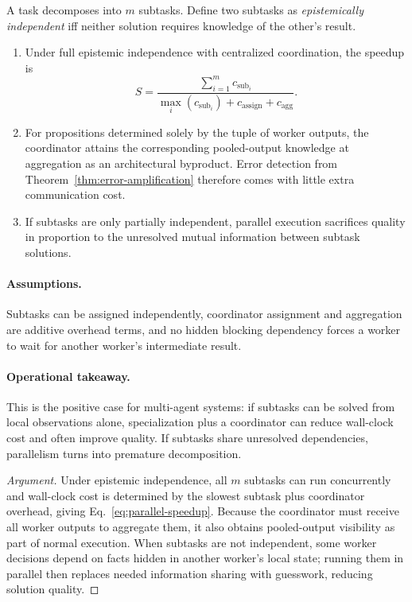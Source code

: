 \begin{definition}
\label{thm:parallel-acceleration}
A task decomposes into $m$ subtasks. Define two subtasks as \emph{epistemically independent} iff
neither solution requires knowledge of the other's result.
\begin{enumerate}[leftmargin=*]
\item[(a)] Under full epistemic independence with centralized coordination, the speedup is
\begin{equation}
S = \frac{\sum_{i=1}^{m} c_{\mathrm{sub}_i}}{\max_i(c_{\mathrm{sub}_i}) + c_{\mathrm{assign}} + c_{\mathrm{agg}}}.
\label{eq:parallel-speedup}
\end{equation}
\item[(b)] For propositions determined solely by the tuple of worker outputs, the coordinator attains the
corresponding pooled-output knowledge at aggregation as an architectural byproduct. Error detection from
Theorem~\ref{thm:error-amplification} therefore comes with little extra communication cost.
\item[(c)] If subtasks are only partially independent, parallel execution sacrifices quality in proportion
to the unresolved mutual information between subtask solutions.
\end{enumerate}
\end{definition}

\paragraph{Assumptions.}
Subtasks can be assigned independently, coordinator assignment and aggregation are additive overhead
terms, and no hidden blocking dependency forces a worker to wait for another worker's intermediate
result.

\paragraph{Operational takeaway.}
This is the positive case for multi-agent systems: if subtasks can be solved from local observations
alone, specialization plus a coordinator can reduce wall-clock cost and often improve quality. If
subtasks share unresolved dependencies, parallelism turns into premature decomposition.

\begin{proof}[Argument]
Under epistemic independence, all $m$ subtasks can run concurrently and wall-clock cost is determined by
the slowest subtask plus coordinator overhead, giving Eq.~\eqref{eq:parallel-speedup}. Because the
coordinator must receive all worker outputs to aggregate them, it also obtains pooled-output visibility as
part of normal execution. When subtasks are not independent, some worker decisions depend on facts hidden
in another worker's local state; running them in parallel then replaces needed information sharing with
guesswork, reducing solution quality.
\end{proof}

